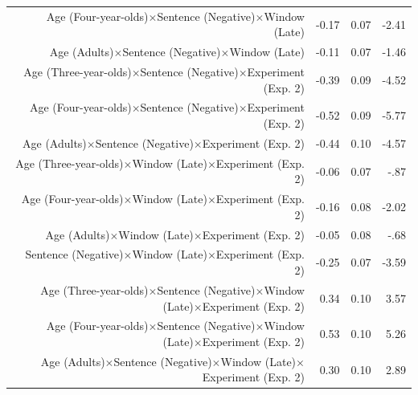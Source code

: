 \documentclass[man]{apa2}
\begin{document}
\begin{table}
\begin{center}
\begin{tabular}{rrrr}
  Age (Four-year-olds)$\times$Sentence (Negative)$\times$Window (Late)  & -0.17 & 0.07 & -2.41 \\ 
  Age (Adults)$\times$Sentence (Negative)$\times$Window (Late)  & -0.11 & 0.07 & -1.46 \\ 
  Age (Three-year-olds)$\times$Sentence (Negative)$\times$Experiment (Exp. 2)  & -0.39 & 0.09 & -4.52 \\ 
  Age (Four-year-olds)$\times$Sentence (Negative)$\times$Experiment (Exp. 2)  & -0.52 & 0.09 & -5.77 \\ 
  Age (Adults)$\times$Sentence (Negative)$\times$Experiment (Exp. 2) & -0.44 & 0.10 & -4.57 \\ 
  Age (Three-year-olds)$\times$Window (Late)$\times$Experiment (Exp. 2)  & -0.06 & 0.07 & -.87 \\ 
  Age (Four-year-olds)$\times$Window (Late)$\times$Experiment (Exp. 2)  & -0.16 & 0.08 & -2.02 \\ 
  Age (Adults)$\times$Window (Late)$\times$Experiment (Exp. 2)  & -0.05 & 0.08 & -.68 \\ 
 Sentence (Negative)$\times$Window (Late)$\times$Experiment (Exp. 2)  & -0.25 & 0.07 & -3.59 \\ 
  Age (Three-year-olds)$\times$Sentence (Negative)$\times$Window (Late)$\times$Experiment (Exp. 2)  & 0.34 & 0.10 & 3.57 \\ 
  Age (Four-year-olds)$\times$Sentence (Negative)$\times$Window (Late)$\times$Experiment (Exp. 2)  & 0.53 & 0.10 & 5.26 \\ 
  Age (Adults)$\times$Sentence (Negative)$\times$Window (Late)$\times$Experiment (Exp. 2) & 0.30 & 0.10 & 2.89 \\ 
   \hline
\end{tabular}
\end{center}
\end{table}
\doublespacing
\end{document}
